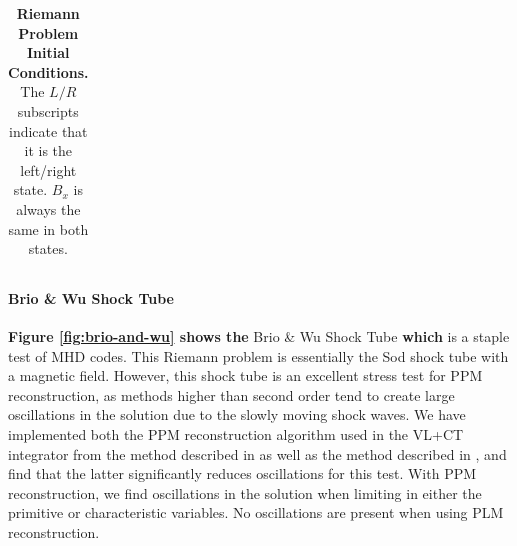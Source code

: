 \documentclass[modern, linenumbers]{aastex631}
\begin{document}
\begin{table}
\begin{tabular}{lcccccccc}
    
    
    \end{tabular}
    \caption{\textbf{Riemann Problem Initial Conditions.} The $L/R$ subscripts indicate that it is the left/right state. $B_x$ is always the same in both states.}
    \label{table:riemann}
\end{table}

\paragraph{Brio \& Wu Shock Tube}
\textbf{Figure \ref{fig:brio-and-wu} shows the} Brio \& Wu Shock Tube \citep{brio_wu_1988} \textbf{which} is a staple test of MHD codes. This Riemann problem is essentially the Sod shock tube \citep{sod_1978} with a magnetic field. However, this shock tube is an excellent stress test for PPM reconstruction, as methods higher than second order tend to create large oscillations in the solution due to the slowly moving shock waves. We have implemented both the PPM reconstruction algorithm used in the VL+CT integrator from the method described in \cite{stone_athena_2008} as well as the method described in \cite{felker_2018}, and find that the latter significantly reduces oscillations for this test. With PPM reconstruction, we find  oscillations in the solution when limiting in either the primitive or characteristic variables. No oscillations are present when using PLM reconstruction.
\end{document}

